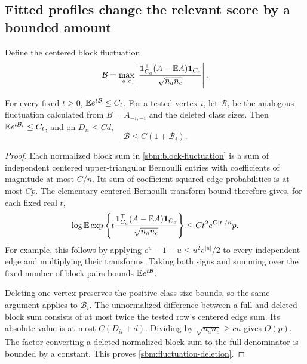 \subsection{Fitted profiles change the relevant score by a bounded amount}
\label{sbm:fitted-section}

Define the centered block fluctuation
\begin{equation}
 \mathcal B
 =\max_{a,c}
 \left|\frac{\mathbf 1_{C_a}^\top(A-\mathbb E A)\mathbf 1_{C_c}}
                   {\sqrt{n_an_c}}\right|.
 \label{sbm:block-fluctuation}
\end{equation}

\begin{lemma}
\label{sbm:block-moments}
For every fixed $t\ge0$, $\mathbb E e^{t\mathcal B}\le C_t$. For a tested
vertex $i$, let $\mathcal B_i$ be the analogous fluctuation calculated
from $B=A_{-i,-i}$ and the deleted class sizes. Then
$\mathbb E e^{t\mathcal B_i}\le C_t$, and on $D_{ii}\le Cd$,
\begin{equation}
 \mathcal B\le C(1+\mathcal B_i).
 \label{sbm:fluctuation-deletion}
\end{equation}
\end{lemma}

\begin{proof}
Each normalized block sum in \eqref{sbm:block-fluctuation} is a sum
of independent centered upper-triangular Bernoulli entries with
coefficients of magnitude at most $C/n$. Its sum of coefficient-squared
edge probabilities is at most $Cp$. The elementary centered Bernoulli
transform bound therefore gives, for each fixed real $t$,
\[
 \log\mathbb E\exp\left\{
 t\frac{\mathbf 1_{C_a}^\top(A-\mathbb E A)\mathbf 1_{C_c}}
         {\sqrt{n_an_c}}\right\}
 \le C t^2 e^{C|t|/n}p.
\]
For example, this follows by applying
$e^u-1-u\le u^2e^{|u|}/2$ to every independent edge and multiplying
their transforms. Taking both signs and summing over the fixed number
of block pairs bounds $\mathbb E e^{t\mathcal B}$.

Deleting one vertex preserves the positive class-size bounds, so the
same argument applies to $\mathcal B_i$. The unnormalized difference
between a full and deleted block sum consists of at most twice the
tested row's centered edge sum. Its absolute value is at most
$C(D_{ii}+d)$. Dividing by $\sqrt{n_an_c}\ge cn$ gives $O(p)$.
The factor converting a deleted normalized block sum to the full
denominator is bounded by a constant. This proves
\eqref{sbm:fluctuation-deletion}.
\end{proof}

